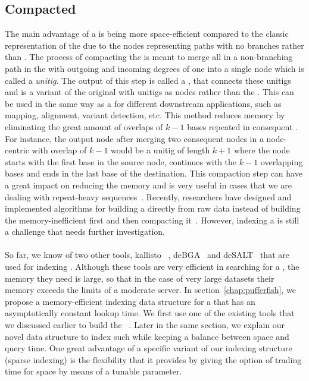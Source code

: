 \subsection{Compacted \dbg}
\label{subsubsec:cdbg}
The main advantage of a \ccdbg is being more space-efficient compared to the
classic representation of the \dbg due to the nodes representing
paths with no branches rather than \kmers.
The process of compacting the \dbg is meant to merge all \kmers in a non-branching path
in the \dbg with outgoing and incoming degrees of
one into a single node which is called a \emph{unitig}.
The output of this step is called a \compdbg,
that connects these unitigs and is a variant of the original \dbg
with unitigs as nodes rather than the \kmers.
This can be used in the same way as a \dbg for different downstream applications,
such as mapping, alignment, variant detection, etc.
This method reduces memory by eliminating the great amount of overlaps of $k-1$ bases
repeated in consequent \kmers.
For instance, the output node after merging two consequent nodes in a node-centric \dbg
with overlap of $k-1$ would be a unitig of length $k+1$ where the node starts with the first base in the source node,
continues with the $k-1$ overlapping bases and ends in
the last base of the destination.
This compaction step can have a great impact on reducing the memory
and is very useful in cases that we are dealing with repeat-heavy sequences~\cite{liu2016debga}.
Recently, researchers have designed and implemented algorithms for building
a \ccdbg directly from raw data instead of building the memory-inefficient \dbg first
and then compacting it~\cite{minkin2016twopaco,chikhi2016compacting}.
However, indexing a \ccdbg is still a challenge that needs further investigation.

\paragraph*{}
So far, we know of two other tools, kallisto~\cite{Bray2016Kallisto}
, deBGA~\cite{liu2016debga} and deSALT~\cite{liu2019desalt} that are used for indexing \ccdbgs.
Although these tools are very efficient in searching for a \kmer, the memory they need is large,
so that in the case of very large datasets their memory exceeds the limits of a moderate server.
In section~\ref{chap:pufferfish}, we propose a memory-efficient indexing data structure
for a \ccdbg that has an asymptotically constant \kmer lookup time.
We first use one of the existing tools that we discussed earlier to build the \ccdbg~\cite{minkin2016twopaco}.
Later in the same section, we explain our novel data structure to index such \ccdbgs
while keeping a balance between space and query time.
One great advantage of a specific variant of our indexing structure (sparse indexing)
is the flexibility that it provides by giving the option of trading time for space
by means of a tunable parameter.

